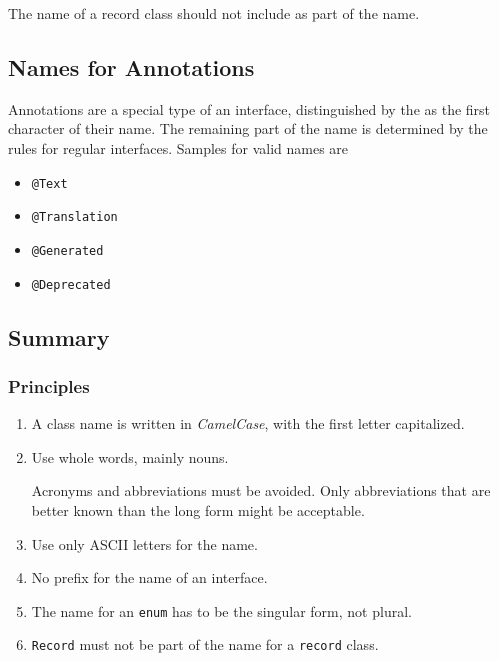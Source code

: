 The name of a record class should not include  as part of the name.


\subsection{Names for Annotations}\label{sec:NamesForAnnotations}
Annotations are a special type of an interface, distinguished by the  as the first character of their name. The remaining part of the name is determined by the rules for regular interfaces. Samples for valid names are 

\begin{itemize}[nosep]
	\item{\lstinline|@Text| \autocite{TQUADRAT_ORG_FOUNDATION_TEXT}}
	
	\item{\lstinline|@Translation| \autocite{TQUADRAT_ORG_FOUNDATION_TRANSLATION}}
	
	\item{\lstinline|@Generated| \autocite{ORACLE_DOC_GENERATED_ANNOTATION}}
	
	\item{\lstinline|@Deprecated| \autocite{ORACLE_DOC_DEPRECATED_ANNOTATION}}
\end{itemize}

\subsection{Summary}
\subsubsection{Principles}
\begin{enumerate}[label=P\arabic*.]
	\item{A class name is written in \textit{CamelCase}, with the first letter capitalized.}
	
	\item{Use whole words, mainly nouns.
	
	Acronyms and abbreviations must be avoided. Only abbreviations that are better known than the long form might be acceptable.}
	
	\item{Use only ASCII letters for the name.}
	
	\item{No prefix for the name of an interface.}
	
	\item{The name for an \lstinline|enum| has to be the singular form, not plural.}
	
	\item{\texttt{Record} must not be part of the name for a \lstinline|record| class.}
\end{enumerate}

